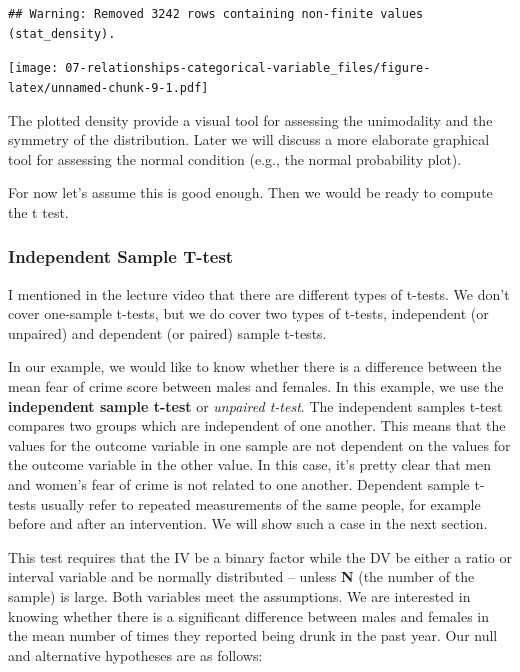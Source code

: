 \documentclass[
]{book}
\begin{document}
\begin{verbatim}
## Warning: Removed 3242 rows containing non-finite values (stat_density).
\end{verbatim}

\texttt{[image: 07-relationships-categorical-variable\_files/figure-latex/unnamed-chunk-9-1.pdf]}

The plotted density provide a visual tool for assessing the unimodality and the symmetry of the distribution. Later we will discuss a more elaborate graphical tool for assessing the normal condition (e.g., the normal probability plot).

For now let's assume this is good enough. Then we would be ready to compute the t test.

\hypertarget{independent-sample-t-test}{%
\subsubsection{Independent Sample T-test}\label{independent-sample-t-test}}

I mentioned in the lecture video that there are different types of t-tests. We don't cover one-sample t-tests, but we do cover two types of t-tests, independent (or unpaired) and dependent (or paired) sample t-tests.

In our example, we would like to know whether there is a difference between the mean fear of crime score between males and females. In this example, we use the \textbf{independent sample t-test} or \emph{unpaired t-test}. The independent samples t-test compares two groups which are independent of one another. This means that the values for the outcome variable in one sample are not dependent on the values for the outcome variable in the other value. In this case, it's pretty clear that men and women's fear of crime is not related to one another. Dependent sample t-tests usually refer to repeated measurements of the same people, for example before and after an intervention. We will show such a case in the next section.

This test requires that the IV be a binary factor while the DV be either a ratio or interval variable and be normally distributed -- unless \textbf{N} (the number of the sample) is large. Both variables meet the assumptions. We are interested in knowing whether there is a significant difference between males and females in the mean number of times they reported being drunk in the past year. Our null and alternative hypotheses are as follows:
\end{document}
